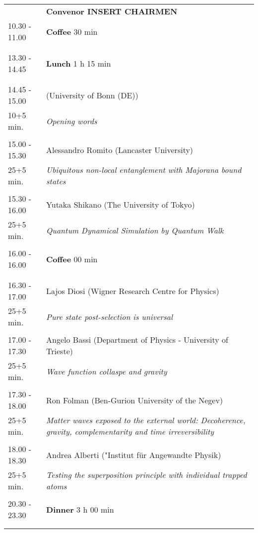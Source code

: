 \begin{longtable}{p{3cm}p{13cm}}
&\hfill {\bf Convenor INSERT CHAIRMEN }\\ 
10.30 - 11.00 & {\bf Coffee} \hfill 30 min \\ 
 & \\ 
 & \\ 
13.30 - 14.45 & {\bf Lunch} \hfill 1 h 15 min \\ 
 & \\ 
 & \\ 
14.45 - 15.00 &  (University of Bonn (DE))\\ 
10+5 min. & {\it Opening words}\\ 
 & \\ 
15.00 - 15.30 & Alessandro Romito (Lancaster University)\\ 
25+5 min. & {\it Ubiquitous non-local entanglement with Majorana bound states}\\ 
 & \\ 
15.30 - 16.00 & Yutaka Shikano (The University of Tokyo)\\ 
25+5 min. & {\it Quantum Dynamical Simulation by Quantum Walk}\\ 
 & \\ 
16.00 - 16.00 & {\bf Coffee} \hfill 00 min \\ 
 & \\ 
 & \\ 
16.30 - 17.00 & Lajos Diosi (Wigner Research Centre for Physics)\\ 
25+5 min. & {\it Pure state post-selection is universal}\\ 
 & \\ 
17.00 - 17.30 & Angelo Bassi (Department of Physics - University of Trieste)\\ 
25+5 min. & {\it Wave function collaspe and gravity}\\ 
 & \\ 
17.30 - 18.00 & Ron Folman (Ben-Gurion University of the Negev)\\ 
25+5 min. & {\it Matter waves exposed to the external world: Decoherence, gravity, complementarity and time irreversibility}\\ 
 & \\ 
18.00 - 18.30 & Andrea Alberti ("Institut für Angewandte Physik)\\ 
25+5 min. & {\it Testing the superposition principle with individual trapped atoms}\\ 
 & \\ 
20.30 - 23.30 & {\bf Dinner} \hfill 3 h 00 min \\ 
 & \\ 
 & \\ 
\end{longtable}

